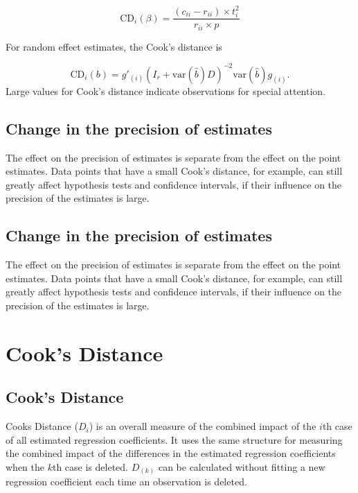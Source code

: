 \documentclass[Main.tex]{subfiles}
\begin{document}
	
	\[
	\mbox{CD}_{i}(\beta) = \frac{(c_{ii} - r_{ii}) \times t^2_{i}}{r_{ii} \times p}
	\]
	
	
	For random effect estimates, the  Cook's distance is
	
	
	\[
	\mbox{CD}_{i}(b) = g{\prime}_{(i)} (I_{r} + \mbox{var}(\hat{b})D)^{-2}\mbox{var}(\hat{b})g_{(i)}.
	\]
	Large values for Cook's distance indicate observations for special attention.
	
	\subsection{Change in the precision of estimates}
	
	The effect on the precision of estimates is separate from the effect on the point estimates. Data points that
	have a small Cook's distance, for example, can still greatly affect hypothesis tests and confidence intervals, if their  influence on the precision of the estimates is large.
	
	
	
	\subsection{Change in the precision of estimates}
	
	
	The effect on the precision of estimates is separate from the effect on the point estimates. Data points that
	have a small Cook's distance, for example, can still greatly affect hypothesis tests and confidence intervals, if their  influence on the precision of the estimates is large.
	
	\newpage
	
	\newpage
	\section{Cook's Distance} %
	
	\subsection{Cook's Distance}%
	Cooks Distance ($D_{i}$) is an overall measure of the combined impact of the $i$th case of all estimated regression coefficients. It uses the same structure for measuring the combined impact of the differences in the estimated regression coefficients when the $k$th case is deleted. $D_{(k)}$ can be calculated without fitting
	a new regression coefficient each time an observation is deleted.
	
\end{document}
